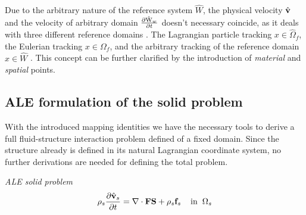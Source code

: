 Due to the arbitrary nature of the reference system $\hat{W}$, the physical velocity $\hat{\mathbf{v}}$ and the velocity of arbitrary domain $\frac{\partial \text{\^{W}}_w}{\partial t}$ doesn't necessary coincide, as it deals with three different reference domains \cite{Richter2016}. The Lagrangian particle tracking $x \in \hat{\Omega}_f $, the Eulerian tracking $x \in \Omega_f $, and the arbitrary tracking of the reference domain $x \in \hat{W} $ \cite{Richter2016}. This concept can be further clarified by the introduction of \textit{material} and \textit{spatial} points. 
\subsection{ALE formulation of the solid problem}
With the introduced mapping identities we have the necessary tools to derive a full fluid-structure interaction problem defined of a fixed domain. Since the structure already is defined in its natural Lagrangian coordinate system, no further derivations are needed for defining the total problem.
\begin{equat}
\textit{ALE solid problem}
\begin{align}
\rho_s \frac{\partial \hat{\mathbf{v}}_s}{\partial t} = \nabla \cdot \mathbf{F}\mathbf{S} + \rho_s \mathbf{f}_s
\hspace{4mm} \text{in} \hspace{2mm} \Omega_s \\
\end{align}
\end{equat}
